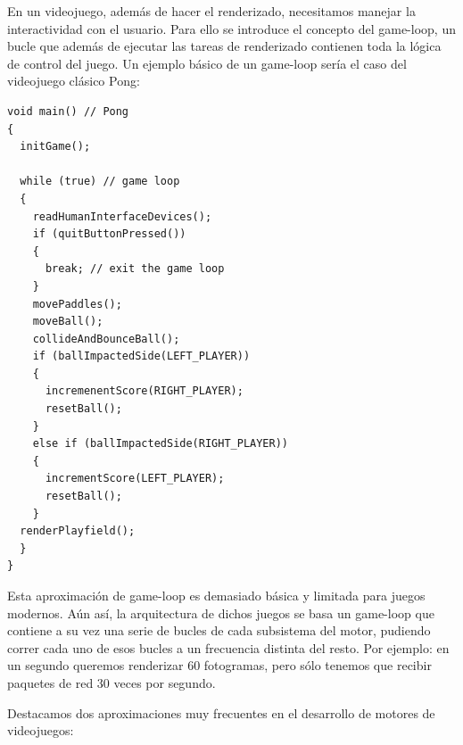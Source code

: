 \documentclass[a4paper,12pt]{report}
\begin{document}
	
	

			
	
	En un videojuego, además de hacer el renderizado, necesitamos manejar la interactividad con el usuario. %
	Para ello se introduce el concepto del game-loop, un bucle que además de ejecutar las tareas de renderizado contienen toda la lógica de control del juego. Un ejemplo básico de un game-loop sería el caso del videojuego clásico Pong:
	
	
		\begin{lstlisting}[style=C, numbers=none]
void main() // Pong
{
  initGame();
	
  while (true) // game loop
  {
    readHumanInterfaceDevices();
    if (quitButtonPressed())
    {
      break; // exit the game loop
    }
    movePaddles();
    moveBall();
    collideAndBounceBall();
    if (ballImpactedSide(LEFT_PLAYER))
    {
      incremenentScore(RIGHT_PLAYER);
      resetBall();
    }
    else if (ballImpactedSide(RIGHT_PLAYER))
    {
      incrementScore(LEFT_PLAYER);
      resetBall();
    }
  renderPlayfield();
  }
}
	\end{lstlisting}
	
	Esta aproximación de game-loop es demasiado básica y limitada para juegos modernos. Aún así, la arquitectura de dichos juegos se basa un game-loop que contiene a su vez una serie de bucles de cada subsistema del motor, pudiendo correr cada uno de esos bucles a un frecuencia distinta del resto. Por ejemplo: en un segundo queremos renderizar 60 fotogramas, pero sólo tenemos que recibir paquetes de red 30 veces por segundo. 
	
	Destacamos dos aproximaciones muy frecuentes en el desarrollo de motores de videojuegos:
	
\end{document}
